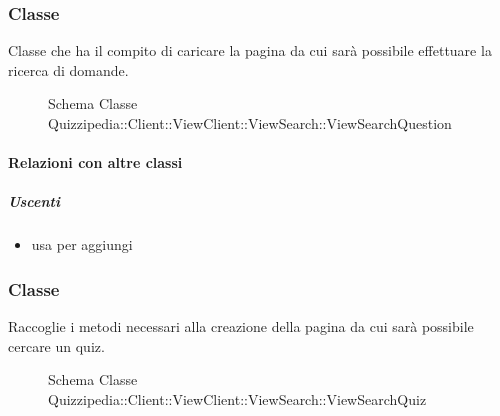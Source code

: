 \subsubsection{Classe }
Classe che ha il compito di caricare la pagina da cui sarà possibile effettuare la ricerca di domande.
\begin{figure}[H]
\centering
\noindent{}
\caption[Schema Classe ViewSearchQuestion]{Schema Classe Quizzipedia::Client::ViewClient::ViewSearch::ViewSearchQuestion}
\end{figure}
\paragraph{Relazioni con altre classi}
\subparagraph{Uscenti}
\begin{itemize}
\item usa  per aggiungi
\end{itemize}
\subsubsection{Classe }
Raccoglie i metodi necessari alla creazione della pagina da cui sarà possibile cercare un quiz.
\begin{figure}[H]
\centering
\noindent{}
\caption[Schema Classe ViewSearchQuiz]{Schema Classe Quizzipedia::Client::ViewClient::ViewSearch::ViewSearchQuiz}
\end{figure}
